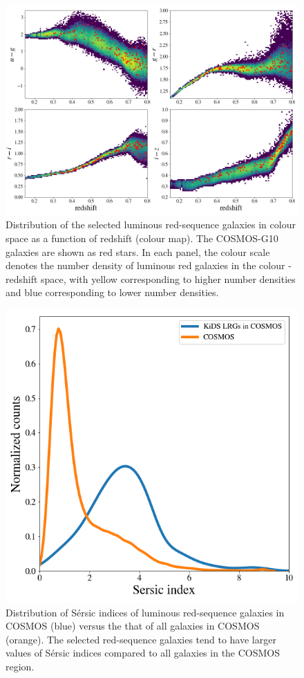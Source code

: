 \documentclass{aa}
\numberwithin{equation}{section}
\begin{document}
\begin{figure}
\includegraphics[width=\textwidth]{figures_tmp/cosmos_color.png}
\caption{Distribution of the selected luminous red-sequence galaxies in colour  space as a function of redshift (colour map). The COSMOS-G10 galaxies are shown as red stars. In each panel, the colour  scale denotes the number density of luminous red galaxies in the colour -redshift space, with yellow corresponding to higher number densities and blue corresponding to lower number densities.} 
\label{fig:cosmos_color}
\end{figure}

\begin{figure}
\includegraphics[width=\columnwidth]{figures_tmp/cosmos_sersic.png}
\caption{Distribution of S\'{e}rsic indices of luminous red-sequence galaxies in COSMOS (blue) versus the that of all galaxies in COSMOS (orange). The selected red-sequence galaxies tend to have larger values of S\'{e}rsic indices compared to all galaxies in the COSMOS region.}
\label{fig:cosmos_sersic}
\end{figure}
\end{document}
